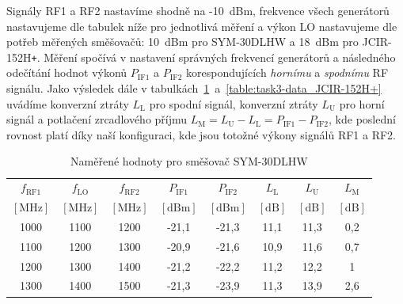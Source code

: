 \documentclass[11pt,a4paper]{article}
\newcommand{\plus}{{\texttt{+}}}
\begin{document}
Signály RF1 a RF2 nastavíme shodně na -10~dBm, frekvence všech generátorů nastavujeme dle tabulek níže pro jednotlivá měření a výkon LO nastavujeme dle potřeb měřených směšovačů: 10~dBm pro SYM-30DLHW a 18~dBm pro JCIR-152H\plus. Měření spočívá v nastavení správných frekvencí generátorů a následného odečítání hodnot výkonů $P_{\mathrm{IF1}}$ a $P_{\mathrm{IF2}}$ korespondujících \emph{hornímu} a \emph{spodnímu} RF signálu. Jako výsledek dále v tabulkách~\ref{table:task3-data_SYM-30DLHW}~a~\ref{table:task3-data_JCIR-152H+} uvádíme konverzní ztráty $L_{\mathrm L}$ pro spodní signál, konverzní ztráty $L_{\mathrm U}$ pro horní signál a potlačení zrcadlového příjmu $L_{\mathrm M} = L_{\mathrm U} - L_{\mathrm L} = P_{\mathrm{IF1}} - P_{\mathrm{IF2}}$, kde poslední rovnost platí díky naší konfiguraci, kde jsou totožné výkony signálů RF1 a RF2.
\begin{table}[!ht]
    \centering
    \begin{tabular}{| c | c | c || c | c || c | c | c |}
        \hline
        $f_{\mathrm{RF1}}$ & $f_{\mathrm{LO}}$ & $f_{\mathrm{RF2}}$ & $P_{\mathrm{IF1}}$ & $P_{\mathrm{IF2}}$ & $L_{\mathrm{L}}$ & $L_{\mathrm{U}}$ & $L_{\mathrm{M}}$\\
        $[\mathrm{MHz}]$ & $[\mathrm{MHz}]$ & $[\mathrm{MHz}]$ & $[\mathrm{dBm}]$ & $[\mathrm{dBm}]$ & $[\mathrm{dB}]$ & $[\mathrm{dB}]$ & $[\mathrm{dB}]$\\
        \hline\hline
        1000 & 1100 & 1200 & -21,1 & -21,3 & 11,1 & 11,3 & 0,2\\
        \hline
        1100 & 1200 & 1300 & -20,9 & -21,6 & 10,9 & 11,6 & 0,7\\
        \hline
        1200 & 1300 & 1400 & -21,2 & -22,2 & 11,2 & 12,2 & 1\\
        \hline
        1300 & 1400 & 1500 & -21,3 & -23,9 & 11,3 & 13,9 & 2,6\\
        \hline
    \end{tabular}
    \caption{Naměřené hodnoty pro směšovač SYM-30DLHW}
    \label{table:task3-data_SYM-30DLHW}
\end{table}
\end{document}
